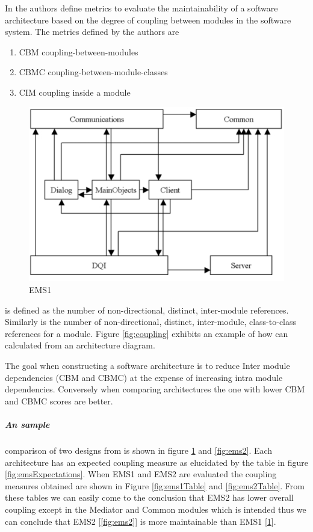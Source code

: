 \documentclass[15pt]{article}
\begin{document}
In \cite{lindvall_empirically-based_2003} the authors define metrics to evaluate the maintainability of a software architecture based on the degree of coupling between modules in the software system. The metrics defined by the authors are
\begin{enumerate}
\item CBM coupling-between-modules
\item CBMC coupling-between-module-classes
\item CIM coupling inside a module
\end{enumerate}

\begin{figure}
	\includegraphics[scale=0.45]{ems1.png} 
	\caption{EMS1 \cite{lindvall_empirically-based_2003}}
	\label{fig:ems1}
\end{figure}

 is defined as the number of non-directional, distinct, inter-module references. Similarly  is the number of non-directional, distinct, inter-module, class-to-class references for a module. Figure \ref{fig:coupling} exhibits an example of how  can calculated from an architecture diagram.


The goal when constructing a software architecture is to reduce Inter module dependencies (CBM and CBMC) at the expense of increasing intra module dependencies. Conversely when comparing architectures the one with lower CBM and CBMC scores are better.



\subparagraph{An sample} comparison of two designs from \cite{lindvall_empirically-based_2003} is shown in figure \ref{fig:ems1} and \ref{fig:ems2}. Each architecture has an expected coupling measure as elucidated by the table in figure \ref{fig:emsExpectations}. When EMS1 and EMS2 are evaluated the coupling measures obtained are shown in Figure \ref{fig:ems1Table} and \ref{fig:ems2Table}. From these tables we can easily come to the conclusion that EMS2 has lower overall coupling except in the Mediator and Common modules which is intended thus we can conclude that EMS2 [\ref{fig:ems2}] is more maintainable than EMS1 [\ref{fig:ems1}].
\end{document}
